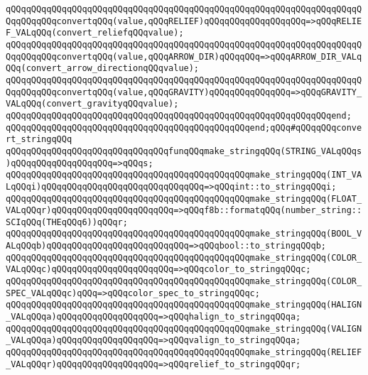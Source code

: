 \verb|qQQqqQQqqQQqqQQqqQQqqQQqqQQqqQQqqQQqqQQqqQQqqQQqqQQqqQQqqQQqqQQqqQQqqQQqqQQqqQQqconvertqQQq(value,qQQqRELIEF)qQQqqQQqqQQqqQQqqQQq=>qQQqRELIEF_VALqQQq(convert_reliefqQQqvalue);|\newline
\verb|qQQqqQQqqQQqqQQqqQQqqQQqqQQqqQQqqQQqqQQqqQQqqQQqqQQqqQQqqQQqqQQqqQQqqQQqqQQqqQQqconvertqQQq(value,qQQqARROW_DIR)qQQqqQQq=>qQQqARROW_DIR_VALqQQq(convert_arrow_directionqQQqvalue);|\newline
\verb|qQQqqQQqqQQqqQQqqQQqqQQqqQQqqQQqqQQqqQQqqQQqqQQqqQQqqQQqqQQqqQQqqQQqqQQqqQQqqQQqconvertqQQq(value,qQQqGRAVITY)qQQqqQQqqQQqqQQq=>qQQqGRAVITY_VALqQQq(convert_gravityqQQqvalue);|\newline
\verb|qQQqqQQqqQQqqQQqqQQqqQQqqQQqqQQqqQQqqQQqqQQqqQQqqQQqqQQqqQQqqQQqend;|\newline
\newline
\verb|qQQqqQQqqQQqqQQqqQQqqQQqqQQqqQQqqQQqqQQqqQQqqQQqend;qQQq#qQQqqQQqconvert_stringqQQq|\newline
\newline
\verb|qQQqqQQqqQQqqQQqqQQqqQQqqQQqqQQqfunqQQqmake_stringqQQq(STRING_VALqQQqs)qQQqqQQqqQQqqQQqqQQq=>qQQqs;|\newline
\verb|qQQqqQQqqQQqqQQqqQQqqQQqqQQqqQQqqQQqqQQqqQQqqQQqmake_stringqQQq(INT_VALqQQqi)qQQqqQQqqQQqqQQqqQQqqQQqqQQqqQQq=>qQQqint::to_stringqQQqi;|\newline
\verb|qQQqqQQqqQQqqQQqqQQqqQQqqQQqqQQqqQQqqQQqqQQqqQQqmake_stringqQQq(FLOAT_VALqQQqr)qQQqqQQqqQQqqQQqqQQqqQQq=>qQQqf8b::formatqQQq(number_string::SCIqQQq(THEqQQq6))qQQqr;|\newline
\verb|qQQqqQQqqQQqqQQqqQQqqQQqqQQqqQQqqQQqqQQqqQQqqQQqmake_stringqQQq(BOOL_VALqQQqb)qQQqqQQqqQQqqQQqqQQqqQQqqQQq=>qQQqbool::to_stringqQQqb;|\newline
\verb|qQQqqQQqqQQqqQQqqQQqqQQqqQQqqQQqqQQqqQQqqQQqqQQqmake_stringqQQq(COLOR_VALqQQqc)qQQqqQQqqQQqqQQqqQQqqQQq=>qQQqcolor_to_stringqQQqc;|\newline
\verb|qQQqqQQqqQQqqQQqqQQqqQQqqQQqqQQqqQQqqQQqqQQqqQQqmake_stringqQQq(COLOR_SPEC_VALqQQqc)qQQq=>qQQqcolor_spec_to_stringqQQqc;|\newline
\verb|qQQqqQQqqQQqqQQqqQQqqQQqqQQqqQQqqQQqqQQqqQQqqQQqmake_stringqQQq(HALIGN_VALqQQqa)qQQqqQQqqQQqqQQqqQQq=>qQQqhalign_to_stringqQQqa;|\newline
\verb|qQQqqQQqqQQqqQQqqQQqqQQqqQQqqQQqqQQqqQQqqQQqqQQqmake_stringqQQq(VALIGN_VALqQQqa)qQQqqQQqqQQqqQQqqQQq=>qQQqvalign_to_stringqQQqa;|\newline
\verb|qQQqqQQqqQQqqQQqqQQqqQQqqQQqqQQqqQQqqQQqqQQqqQQqmake_stringqQQq(RELIEF_VALqQQqr)qQQqqQQqqQQqqQQqqQQq=>qQQqrelief_to_stringqQQqr;|\newline
